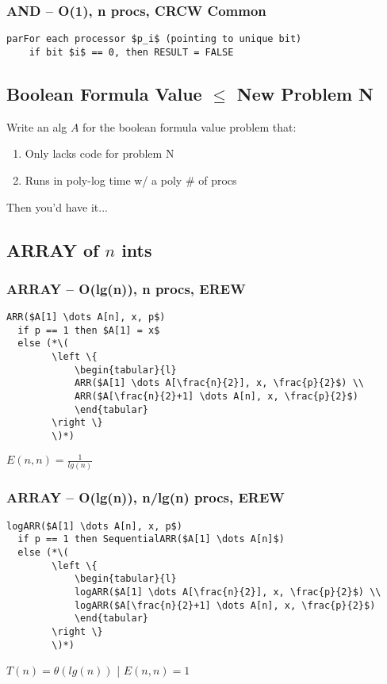 \documentclass[12pt]{article}
\providecommand{\tightlist}{
    \setlength{\itemsep}{0pt}\setlength{\parskip}{0pt}
}
\providecommand{\reducible}[2]{
  \textbf{#1} $\leq$ \textbf{#2}
}
\begin{document}
\subsubsection{AND -- O(1), n procs, CRCW Common}
\begin{lstlisting}
parFor each processor $p_i$ (pointing to unique bit)
    if bit $i$ == 0, then RESULT = FALSE
\end{lstlisting}


\subsection{\reducible{Boolean Formula Value}{New Problem N}}
Write an alg $A$ for the boolean formula value problem that:\\
\begin{enumerate}\tightlist
  \item Only lacks code for problem N
  \item Runs in poly-log time w/ a poly # of procs
\end{enumerate}
Then you'd have it...


\subsection{ARRAY of $n$ ints}
\subsubsection{ARRAY -- O(lg(n)), n procs, EREW}
\begin{lstlisting}
ARR($A[1] \dots A[n], x, p$)
  if p == 1 then $A[1] = x$
  else (*\(
        \left \{
            \begin{tabular}{l}
            ARR($A[1] \dots A[\frac{n}{2}], x, \frac{p}{2}$) \\
            ARR($A[\frac{n}{2}+1] \dots A[n], x, \frac{p}{2}$)
            \end{tabular}
        \right \}
        \)*)
\end{lstlisting}
$E(n,n) = \frac{1}{lg(n)}$
\subsubsection{ARRAY -- O(lg(n)), n/lg(n) procs, EREW}
\begin{lstlisting}
logARR($A[1] \dots A[n], x, p$)
  if p == 1 then SequentialARR($A[1] \dots A[n]$)
  else (*\(
        \left \{
            \begin{tabular}{l}
            logARR($A[1] \dots A[\frac{n}{2}], x, \frac{p}{2}$) \\
            logARR($A[\frac{n}{2}+1] \dots A[n], x, \frac{p}{2}$)
            \end{tabular}
        \right \}
        \)*)
\end{lstlisting}
$T(n) = \theta(lg(n))$ | $E(n,n) = 1$
\end{document}
